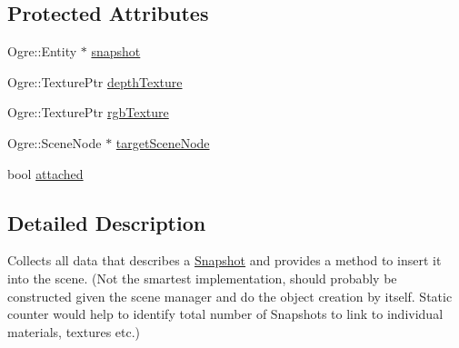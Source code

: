 \subsection*{\-Protected \-Attributes}
\begin{DoxyCompactItemize}
\item 
\-Ogre\-::\-Entity $\ast$ \hyperlink{classSnapshot_a049a4347e562c85029ddc099dc019e17}{snapshot}
\item 
\-Ogre\-::\-Texture\-Ptr \hyperlink{classSnapshot_aa568adf9051f6eb80353f7f1673cdb33}{depth\-Texture}
\item 
\-Ogre\-::\-Texture\-Ptr \hyperlink{classSnapshot_af759834693d9319f38be4e3d3cbe48c0}{rgb\-Texture}
\item 
\-Ogre\-::\-Scene\-Node $\ast$ \hyperlink{classSnapshot_ab86c0038377f46c94957bf5634c74b03}{target\-Scene\-Node}
\item 
bool \hyperlink{classSnapshot_a0c9100c6611542fafa58b9bcde75bc3d}{attached}
\end{DoxyCompactItemize}


\subsection{\-Detailed \-Description}
\-Collects all data that describes a \hyperlink{classSnapshot}{\-Snapshot} and provides a method to insert it into the scene. (\-Not the smartest implementation, should probably be constructed given the scene manager and do the object creation by itself. \-Static counter would help to identify total number of \-Snapshots to link to individual materials, textures etc.) 

